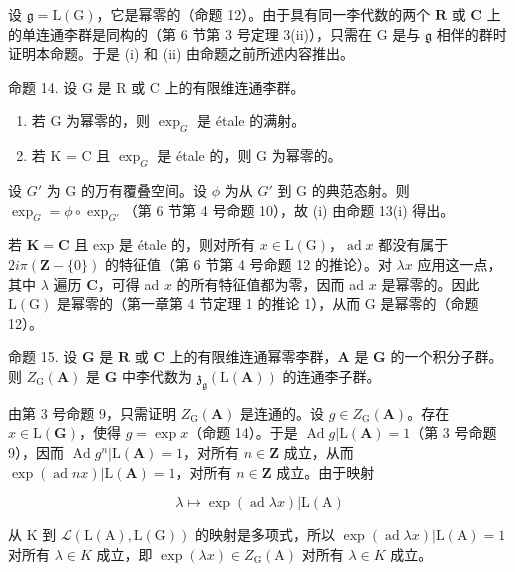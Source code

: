 设 \(\mathfrak{g} = \mathrm{L}(\mathrm{G})\)，它是幂零的（命题 12）。由于具有同一李代数的两个 \(\mathbf{R}\) 或 \(\mathbf{C}\) 上的单连通李群是同构的（第 6 节第 3 号定理 3(ii)），只需在 \(\mathrm{G}\) 是与 \(\mathfrak{g}\) 相伴的群时证明本命题。于是 (i) 和 (ii) 由命题之前所述内容推出。

命题 14. 设 G 是 R 或 C 上的有限维连通李群。

\begin{enumerate}
\def\labelenumi{(\roman{enumi})}
\item
  若 G 为幂零的，则 \(\exp_{G}\) 是 étale 的满射。
\item
  若 K = C 且 \(\exp_{G}\) 是 étale 的，则 G 为幂零的。
\end{enumerate}

设 \(G'\) 为 G 的万有覆叠空间。设 \(\phi\) 为从 \(G'\) 到 G 的典范态射。则 \(\exp_G = \phi \circ \exp_{G'}\)（第 6 节第 4 号命题 10），故 (i) 由命题 13(i) 得出。

若 \(\mathbf{K} = \mathbf{C}\) 且 exp 是 étale 的，则对所有 \(x \in \mathrm{L}(\mathrm{G})\)，\(\operatorname{ad} x\) 都没有属于 \(2i\pi (\mathbf{Z} - \{0\})\) 的特征值（第 6 节第 4 号命题 12 的推论）。对 \(\lambda x\) 应用这一点，其中 \(\lambda\) 遍历 \(\mathbf{C}\)，可得 ad \(x\) 的所有特征值都为零，因而 ad \(x\) 是幂零的。因此 \(\mathrm{L}(\mathrm{G})\) 是幂零的（第一章第 4 节定理 1 的推论 1），从而 G 是幂零的（命题 12）。

命题 15. 设 \(\mathbf{G}\) 是 \(\mathbf{R}\) 或 \(\mathbf{C}\) 上的有限维连通幂零李群，\(\mathbf{A}\) 是 \(\mathbf{G}\) 的一个积分子群。则 \(Z_{\mathrm{G}}(\mathbf{A})\) 是 \(\mathbf{G}\) 中李代数为 \(\mathfrak{z}_{\mathfrak{g}}(\mathrm{L}(\mathbf{A}))\) 的连通李子群。

由第 3 号命题 9，只需证明 \(Z_{\mathrm{G}}(\mathbf{A})\) 是连通的。设 \(g \in Z_{\mathrm{G}}(\mathbf{A})\)。存在 \(x \in \mathrm{L}(\mathbf{G})\)，使得 \(g = \exp x\)（命题 14）。于是 \(\operatorname{Ad} g|\mathrm{L}(\mathbf{A}) = 1\)（第 3 号命题 9），因而 \(\operatorname{Ad} g^n |\mathrm{L}(\mathbf{A}) = 1\)，对所有 \(n \in \mathbf{Z}\) 成立，从而 \(\exp (\operatorname{ad} nx)|\mathrm{L}(\mathbf{A}) = 1\)，对所有 \(n \in \mathbf{Z}\) 成立。由于映射

\[
\lambda \mapsto \exp (\operatorname{ad} \lambda x) | \mathrm{L} (\mathrm{A})
\]

从 K 到 \(\mathcal{L}(\mathrm{L}(\mathrm{A}),\mathrm{L}(\mathrm{G}))\) 的映射是多项式，所以 \(\exp(\operatorname{ad}\lambda x)|\mathrm{L}(\mathrm{A})=1\) 对所有 \(\lambda\in K\) 成立，即 \(\exp(\lambda x)\in Z_{\mathrm{G}}(\mathrm{A})\) 对所有 \(\lambda\in K\) 成立。

